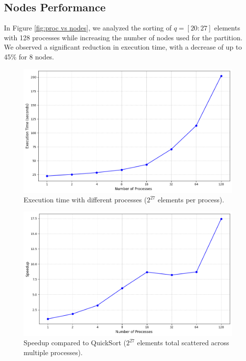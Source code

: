 \documentclass{article}
\begin{document}
\subsection{Nodes Performance}
In Figure \ref{fig:proc vs nodes}, we analyzed the sorting of $q = [20:27]$ elements with 128 processes while increasing the number of nodes used for the partition. We observed a significant reduction in execution time, with a decrease of up to 45\% for 8 nodes.

\begin{figure}[h!]
    \centering
    \includegraphics[width=1\linewidth]{assets/performance.png}
    \caption{Execution time with different processes ($2^{27}$ elements per process).}
    \label{fig:performance}
\end{figure}

\begin{figure}[h!]
    \centering
    \includegraphics[width=1\linewidth]{assets/speedup.png}
    \caption{Speedup compared to QuickSort ($2^{27}$ elements total scattered across multiple processes).}
    \label{fig:speedup}
\end{figure}
\end{document}
